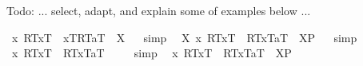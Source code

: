\begin{isabellebody}
\isamarkuptrue%
%
\begin{isamarkuptext}%
Todo: ... select, adapt, and explain some of examples below ...%
\end{isamarkuptext}%
\isamarkuptrue%
\isamarkupfalse%
\ {\isachardoublequoteopen}{\isasymlparr}\isactrlbold {\isasymlambda}x{\isachardot}\ {\isasymlparr}R\isactrlsup T{\isacharcomma}x\isactrlsup T{\isasymrparr}\ \isactrlbold {\isasymrightarrow}\ {\isasymlbrace}x\isactrlsup T{\isacharcomma}R\isactrlsup T{\isasymrbrace}{\isacharcomma}a\isactrlsup T{\isasymrparr}\ {\isacharequal}\ X{\isachardoublequoteclose}%
\isadelimproof
\ %
\endisadelimproof
%
\isatagproof
{}\isamarkupfalse%
\ simp\ \isamarkupfalse%
%
\endisatagproof
{\isafoldproof}%
%
\isadelimproof
%
\endisadelimproof
\isanewline
\isanewline
{}\isamarkupfalse%
\ {\isachardoublequoteopen}{\isasymexists}X{\isachardot}\ {\isasymlparr}\isactrlbold {\isasymlambda}x{\isachardot}\ {\isasymlparr}R\isactrlsup T{\isacharcomma}x\isactrlsup T{\isasymrparr}\ \isactrlbold {\isasymrightarrow}\ {\isasymlparr}R\isactrlsup T{\isacharcomma}x\isactrlsup T{\isasymrparr}{\isacharcomma}a\isactrlsup T{\isasymrparr}\ {\isacharequal}\ {\isacharparenleft}X\isactrlsup P{\isacharparenright}{\isachardoublequoteclose}%
\isadelimproof
\ %
\endisadelimproof
%
\isatagproof
{}\isamarkupfalse%
\ simp\ \isamarkupfalse%
\ %
%
\endisatagproof
{\isafoldproof}%
%
\isadelimproof
%
\endisadelimproof
\isanewline
{}\isamarkupfalse%
\ {\isachardoublequoteopen}{\isacharbrackleft}{\isasymlparr}\isactrlbold {\isasymlambda}x{\isachardot}\ {\isasymlparr}R\isactrlsup T{\isacharcomma}x\isactrlsup T{\isasymrparr}\ \isactrlbold {\isasymrightarrow}\ {\isasymlparr}R\isactrlsup T{\isacharcomma}x\isactrlsup T{\isasymrparr}{\isacharcomma}a\isactrlsup T{\isasymrparr}{\isacharbrackright}\ {\isacharequal}\ {\isasymtop}{\isachardoublequoteclose}%
\isadelimproof
\ %
\endisadelimproof
%
\isatagproof
{}\isamarkupfalse%
\ simp\ \isamarkupfalse%
%
\endisatagproof
{\isafoldproof}%
%
\isadelimproof
%
\endisadelimproof
\isanewline
\isanewline
{}\isamarkupfalse%
\ {\isachardoublequoteopen}{\isasymlparr}\isactrlbold {\isasymlambda}x{\isachardot}\ {\isasymlparr}R\isactrlsup T{\isacharcomma}x\isactrlsup T{\isasymrparr}\ \isactrlbold {\isasymrightarrow}\ {\isasymlparr}R\isactrlsup T{\isacharcomma}x\isactrlsup T{\isasymrparr}{\isacharcomma}a\isactrlsup T{\isasymrparr}\ {\isacharequal}\ {\isacharparenleft}X\isactrlsup P{\isacharparenright}{\isachardoublequoteclose}%

\end{isabellebody}
